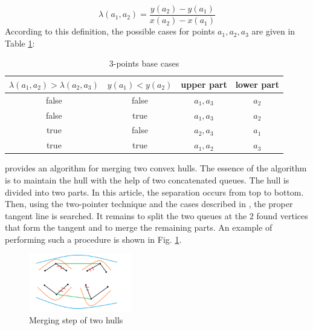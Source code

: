 \documentclass[sigconf]{acmart}
\begin{document}
		\begin{equation}
			\lambda(a_1, a_2)=\frac{y(a_2)-y(a_1)}{x(a_2)-x(a_1)}
		\end{equation}
		According to this definition, the possible cases for points $a_1,a_2,a_3$ are given in Table \ref{table:3points}:
		
		\begin{table}[htbp]
			\caption{3-points base cases}
			\label{table:3points}
			\begin{center}
				\begin{tabular}{|c|c|c|c|}
					\hline
					\textbf{$\lambda(a_1, a_2) > \lambda(a_2, a_3)$} & \textbf{$y(a_1) < y(a_2)$} & upper part & lower part\\
					\hline
					false & false & $a_1, a_3$ & $a_2$ \\
					\hline
					false & true & $a_1, a_3$ & $a_2$ \\
					\hline
					true & false & $a_2, a_3$ & $a_1$ \\
					\hline
					true & true & $a_1, a_2$ & $a_3$ \\
					\hline
				\end{tabular} 
			\end{center}
		\end{table} 
	

		\cite{overmars} provides an algorithm for merging two convex hulls. The essence of the algorithm is to maintain the hull with the help of two concatenated queues. The hull is divided into two parts. In this article, the separation occurs from top to bottom. Then, using the two-pointer technique and the cases described in \cite{overmars}, the proper tangent line is searched. It remains to split the two queues at the 2 found vertices that form the tangent and to merge the remaining parts. An example of performing such a procedure is shown in Fig. \ref{fig:ch_union}.
		
		\begin{figure}[htbp]
			\centerline{\includegraphics[width=0.4\textwidth, height=0.2\textheight]{ch_union}}
			\caption{Merging step of two hulls}
			\label{fig:ch_union}
		\end{figure}
		
\end{document}
